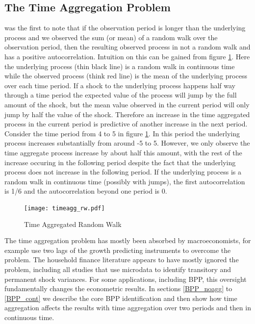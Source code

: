 \documentclass[titlepage]{\econtex}\newcommand{\texname}{IncomeUncertainty}
\begin{document}
\subsection{The Time Aggregation Problem}
\cite{working_note_1960} was the first to note that if the observation period is longer than the underlying process and we observed the sum (or mean) of a random walk over the observation period, then the resulting observed process in not a random walk and has a positive autocorrelation. Intuition on this can be gained from figure \ref{fig:TimeAgg}. Here the underlying process (thin black line) is a random walk in continuous time while the observed process (think red line) is the mean of the underlying process over each time period. If a shock to the underlying process happens half way through a time period the expected value of the process will jump by the full amount of the shock, but the mean value observed in the current period will only jump by half the value of the shock. Therefore an increase in the time aggregated process in the current period is predictive of another increase in the next period. Consider the time period from 4 to 5 in figure \ref{fig:TimeAgg}. In this period the underlying process increases substantially from around -5 to 5. However, we only observe the time aggregate process increase by about half this amount, with the rest of the increase occuring in the following period despite the fact that the underlying process does not increase in the following period. If the underlying process is a random walk in continuous time (possibly with jumps), the first autocorrelation is 1/6 and the autocorrelation beyond one period is 0.
	\begin{figure} 
	\begin{centering}
		\texttt{[image: timeagg\_rw.pdf]} 
		\caption{Time Aggregated Random Walk}
		\label{fig:TimeAgg}
	\end{centering}
\end{figure}
The time aggregation problem has mostly been absorbed by macroeconomists, for example \cite{campbell_consumption_1989} use two lags of the growth predicting instruments to overcome the problem. The household finance literature appears to have mostly ignored the problem, including all studies that use microdata to identify transitory and permanent shock variances. For some applications, including BPP, this oversight fundamentally changes the econometric results. In sections \ref{BPP_noagg} to \ref{BPP_cont} we describe the core BPP identification and then show how time aggregation affects the results with time aggregation over two periods and then in continuous time.
\end{document}
